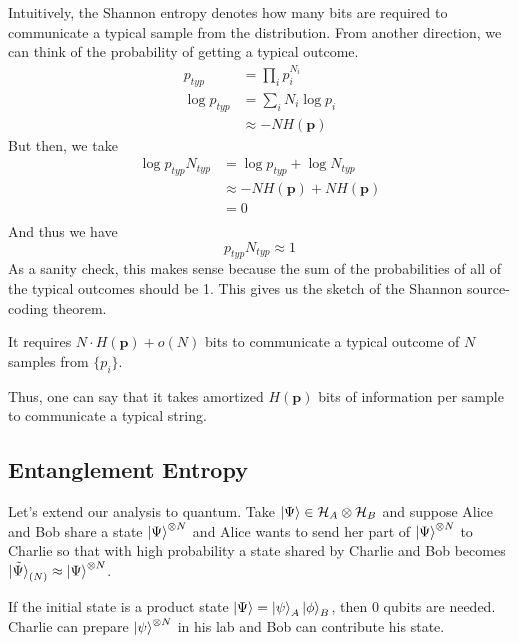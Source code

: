 Intuitively, the Shannon entropy denotes how many bits are required to communicate a typical sample from the distribution.
From another direction, we can think of the probability of getting a typical outcome.
\begin{align*}
    p_{typ} &= \prod_i p_i^{N_i} \\
    \log p_{typ} &= \sum_i N_i \log p_i \\
    &\approx -N H(\mathbf{p})
\end{align*}
But then, we take
\begin{align*}
    \log p_{typ} N_{typ} &= \log p_{typ} + \log N_{typ} \\
    &\approx -N H(\mathbf{p}) + N H(\mathbf{p}) \\ 
    &= 0 \\
\end{align*}
And thus we have 
\[ p_{typ} N_{typ} \approx 1\]
As a sanity check, this makes sense because the sum of the probabilities of all of the typical outcomes should be 1. This gives us the sketch of the Shannon source-coding theorem.

\begin{theorem}
   It requires $N \cdot H(\mathbf{p}) + o(N)$ bits to communicate a typical outcome of $N$ samples from $\{p_i\}$. 
\end{theorem}

Thus, one can say that it takes amortized $H(\mathbf{p})$ bits of information per sample to communicate a typical string.

\subsection{Entanglement Entropy}
Let's extend our analysis to quantum. Take $\ket{\Psi} \in \mathcal{H}_A \otimes \mathcal{H}_B$ and suppose Alice and Bob share a state
$\ket{\Psi}^{\otimes N}$ and Alice wants to send her part of $\ket{\Psi}^{\otimes N}$ to Charlie
so that with high probability a state shared by Charlie and Bob becomes $\tilde{\ket{\Psi}}_{(N)} \approx \ket{\Psi}^{\otimes N}$.

If the initial state is a product state $\ket{\Psi} = \ket{\psi}_A \ket{\phi}_B$,
then 0 qubits are needed. Charlie can prepare $\ket{\psi}^{\otimes N}$ in his lab and Bob can contribute his state.

